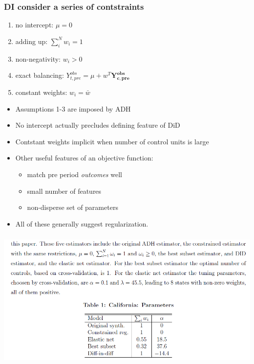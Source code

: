 \begin{frame}
    \frametitle{DI consider a series of contstraints}
  \begin{enumerate}
    \item no intercept: $\mu = 0$
    \item adding up: $ \sum_i^N w_i = 1$
    \item non-negativity: $w_i > 0$ 
    \item exact balancing: $Y_{t,pre}^{obs} = \mu + w^T\mathbf{Y_{c,pre}^{obs}}$
    \item constant weights: $w_i = \bar w$ 
  \end{enumerate}

  \begin{itemize}
    \item Assumptions 1-3 are imposed by ADH 
    \item No intercept actually precludes defining feature of DiD
    \item Contstant weights implicit when number of control units is large
    \item Other useful features of an objective function:
    \begin{itemize}
      \item match pre period \textit{outcomes} well 
      \item small number of features 
      \item non-disperse set of parameters
    \end{itemize}
    \item All of these generally suggest regularization. 
  \end{itemize}
\end{frame}

\begin{frame}
  \frametitle{}
  \begin{center}
    \includegraphics[width=\textwidth]{./resources/DI_CAweights}
  \end{center}  
\end{frame}

